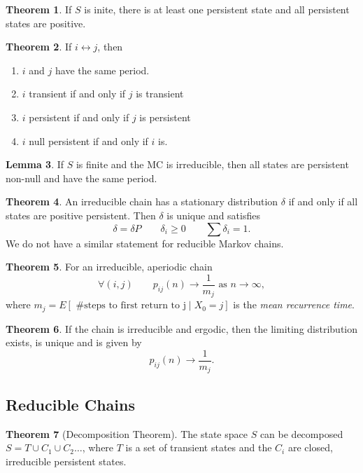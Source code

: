 \documentclass{article}
\theoremstyle{definition}
\newtheorem{theorem}{Theorem}[section]
\newtheorem{lemma}[theorem]{Lemma}
\begin{document}
\begin{theorem}
If $S$ is inite, there is at least one persistent state and all persistent states are positive.
\end{theorem}

\begin{theorem}
If $i \leftrightarrow j$, then 
\begin{enumerate}
\item $i$ and $j$ have the same period.
\item $i$ transient if and only if $j$ is transient 
\item $i$ persistent if and only if $j$ is persistent
\item $i$ null persistent if and only if $i$ is. 
\end{enumerate}
\end{theorem}

\begin{lemma}
If $S$ is finite and the MC is irreducible, then all states are persistent non-null and have the same period.
\end{lemma}

\begin{theorem}
An irreducible chain has a stationary distribution $\delta$ if and only if all states are positive persistent. Then $\delta$ is unique and satisfies
$$
\delta = \delta P \qquad \delta_i \ge 0 \qquad \sum \delta_i = 1.
$$
We do not have a similar statement for reducible Markov chains. 
\end{theorem}

\begin{theorem}
For an irreducible, aperiodic chain
$$
\forall (i,j) \qquad  p_{ij}(n) \to \frac{1}{m_j} \text{ as } n \to \infty,
$$
where $m_j = E \left[ \text{ \# steps to first return to j} \mid X_0 = j \right]$ is the \emph{mean recurrence time}.
\end{theorem}

\begin{theorem}
If the chain is irreducible and ergodic, then the limiting distribution exists, is unique and is given by
$$
p_{ij}(n) \to \frac{1}{m_j}.
$$
\end{theorem}

\subsection{Reducible Chains}

\begin{theorem}[Decomposition Theorem]
The state space $S$ can be decomposed $S = T \cup C_1 \cup C_2 \ldots$, where $T$ is a set of transient states and the $C_i$ are closed, irreducible persistent states.
\end{theorem}
\end{document}
